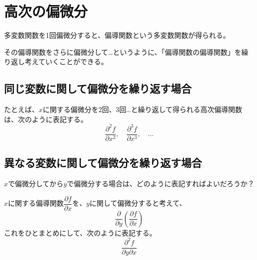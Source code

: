 \documentclass[../../../topic_calculus]{subfiles}
\begin{document}
\sectionline
\section{高次の偏微分}

多変数関数を1回偏微分すると、偏導関数という多変数関数が得られる。

その偏導関数をさらに偏微分して…というように、「偏導関数の偏導関数」を繰り返し考えていくことができる。

\subsection{同じ変数に関して偏微分を繰り返す場合}

たとえば、$x$に関する偏微分を2回、3回…と繰り返して得られる高次偏導関数は、次のように表記する。
\begin{equation*}
  \dfrac{\partial^2 f}{\partial x^2}, \quad
  \dfrac{\partial^3 f}{\partial x^3}, \quad \ldots
\end{equation*}

\subsection{異なる変数に関して偏微分を繰り返す場合}

$x$で偏微分してから$y$で偏微分する場合は、どのように表記すればよいだろうか？

\br

$x$に関する偏導関数$\dfrac{\partial f}{\partial x}$を、$y$に関して偏微分すると考えて、
\begin{equation*}
  \dfrac{\partial}{\partial y}\left(\dfrac{\partial f}{\partial x}\right)
\end{equation*}
これをひとまとめにして、次のように表記する。
\begin{equation*}
  \dfrac{\partial^2 f}{\partial y \partial x}
\end{equation*}
\end{document}
